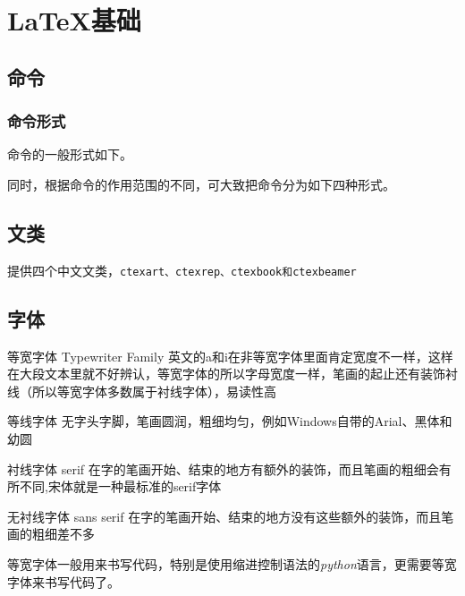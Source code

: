 {\let\clearpage\relax \chapter{\LaTeX 基础}}

\section{命令}

\subsection{命令形式}

命令的一般形式如下。

\begin{latex}{}
\end{latex}

同时，根据命令的作用范围的不同，可大致把命令分为如下四种形式。

\section{文类}

\CTeX 提供四个中文文类，\texttt{ctexart、ctexrep、ctexbook和ctexbeamer}

\section{字体}

\begin{asparadesc}
	\item[等宽字体] Typewriter Family 英文的a和i在非等宽字体里面肯定宽度不一样，这样在大段文本里就不好辨认，等宽字体的所以字母宽度一样，笔画的起止还有装饰衬线（所以等宽字体多数属于衬线字体），易读性高
	\item[等线字体] 无字头字脚，笔画圆润，粗细均匀，例如Windows自带的Arial、黑体和幼圆
	\item[衬线字体] serif 在字的笔画开始、结束的地方有额外的装饰，而且笔画的粗细会有所不同,宋体就是一种最标准的serif字体
	\item[无衬线字体] sans serif 在字的笔画开始、结束的地方没有这些额外的装饰，而且笔画的粗细差不多
\end{asparadesc}

等宽字体一般用来书写代码，特别是使用缩进控制语法的\emph{python}语言，更需要等宽字体来书写代码了。

